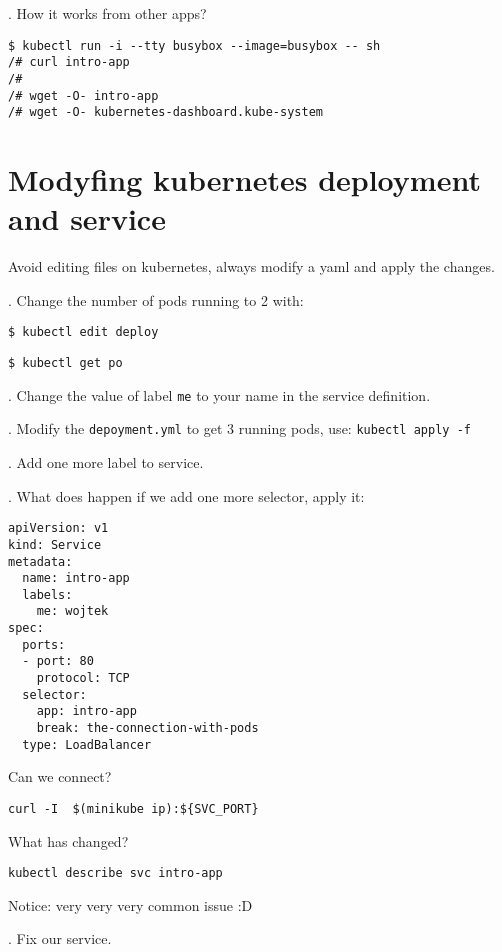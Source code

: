 \documentclass[12pt, letterpaper]{article}
\begin{document}
. How it works from other apps?

\begin{verbatim}
$ kubectl run -i --tty busybox --image=busybox -- sh
/# curl intro-app
/#
/# wget -O- intro-app
/# wget -O- kubernetes-dashboard.kube-system
\end{verbatim}

%
%
%
\section{Modyfing kubernetes deployment and service}

Avoid editing files on kubernetes, always modify a yaml and apply the changes.

. Change the number of pods running to 2 with:

\begin{verbatim}
$ kubectl edit deploy
\end{verbatim}

\begin{verbatim}
$ kubectl get po
\end{verbatim}

. Change the value of label \verb|me| to your name in the service definition.

. Modify the \verb|depoyment.yml| to get 3 running pods, use: \texttt{kubectl apply -f}

. Add one more label to service.

. What does happen if we add one more selector, apply it:

\begin{verbatim}
apiVersion: v1
kind: Service
metadata:
  name: intro-app
  labels:
    me: wojtek
spec:
  ports:
  - port: 80
    protocol: TCP
  selector:
    app: intro-app
    break: the-connection-with-pods
  type: LoadBalancer
\end{verbatim}

Can we connect?

\begin{verbatim}
curl -I  $(minikube ip):${SVC_PORT}
\end{verbatim}

What has changed?
\begin{verbatim}
kubectl describe svc intro-app
\end{verbatim}

\bigskip
Notice: {\large very very very common issue} :D

. Fix our service.
\end{document}
